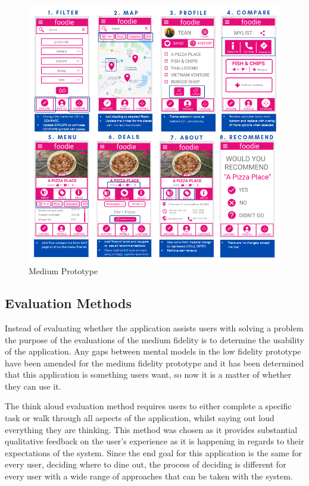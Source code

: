 \documentclass[a4 paper, 12pt]{article}
\begin{document}
        \begin{figure} [H]
            \centering
            \includegraphics[width=\textwidth, frame]
                {./Med_Fidelity/Med_Report/images/med_proto_notes.PNG}  
            \caption{Medium Prototype}
        \end{figure}   
        
    \subsection{Evaluation Methods}
    Instead of evaluating whether the application assists users with solving a problem the purpose of the evaluations of the medium fidelity is to determine the usability of the application. Any gaps between mental models in the low fidelity prototype have been amended for the medium fidelity prototype and it has been determined that this application is something users want, so now it is a matter of whether they can use it.  

    The think aloud evaluation method requires users to either complete a specific task or walk through all aspects of the application, whilst saying out loud everything they are thinking. This method was chosen as it provides substantial qualitative feedback on the user's experience as it is happening in regards to their expectations of the system. Since the end goal for this application is the same for every user, deciding where to dine out, the process of deciding is different for every user with a wide range of approaches that can be taken with the system.
\end{document}
